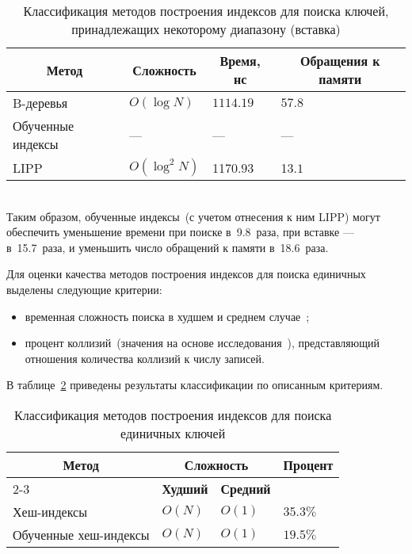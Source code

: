 {
\captionsetup{format=hang,justification=raggedleft,
              singlelinecheck=off,width=17cm}
\begin{longtable}[Hc]{|p{5cm}|p{2cm}|p{2cm}|p{2cm}|}
\caption{Классификация методов построения индексов для поиска ключей,
принадлежащих некоторому диапазону (вставка)\label{tab:02}}\\
    \hline
    \multicolumn{1}{|c|}{\textbf{Метод}} &
    \multicolumn{1}{c|}{\textbf{Сложность}} &
    \multicolumn{1}{c|}{\textbf{Время, нс}} &
    \multicolumn{1}{c|}{\parbox{3cm}{\vspace{2mm}\centering\textbf{Обращения к
    памяти}}}\\[2.5ex]
    \hline
    B-деревья
    & $O(\log N)$
    & $1114.19$
    & $57.8$\\
    \hline
    Обученные индексы
    & ---
    & ---
    & ---\\
    \hline
    LIPP 
    & $O(\log^2 N)$
    & \color{white}11\color{black}$70.93$
    & \color{white}1\color{black}$3.1$\\
    \hline
\end{longtable}
}
~\\

Таким образом, обученные индексы~(с учетом отнесения к ним LIPP) могут
обеспечить уменьшение времени при поиске в~9.8~раза, при вставке ---
в~15.7~раза, и уменьшить число обращений к памяти в~18.6~раза.

Для оценки качества методов построения индексов для поиска единичных выделены
следующие критерии:
\begin{itemize}
    \item временная сложность поиска в худшем и среднем случае~\cite{main,
        squares};
    \item процент коллизий~(значения на основе исследования~\cite{main}),
        представляющий отношения количества коллизий к числу записей.
        
\end{itemize}

В таблице~\ref{tab:03} приведены результаты классификации по описанным
критериям.

{
\captionsetup{format=hang,justification=raggedleft,
              singlelinecheck=off,width=17cm}
\begin{longtable}[Hc]{|p{5.3cm}|p{2cm}|p{2cm}|p{2cm}|}
\caption{Классификация методов построения индексов для поиска единичных
ключей\label{tab:03}}\\
    \hline
    \multicolumn{1}{|c|}{\multirow{2}{*}{\textbf{Метод}}} &
    \multicolumn{2}{c|}{\textbf{Сложность}} &
    \multicolumn{1}{c|}{\multirow{2}{*}{\parbox{2cm}{\textbf{Процент}}}}\\
    \cline{2-3}
    & \multicolumn{1}{c|}{\textbf{Худший}}
    & \multicolumn{1}{c|}{\textbf{Средний}}
    &\\
    \hline
    Хеш-индексы
    & $O(N)$
    & $O(1)$
    & $35.3\%$\\
    \hline
    Обученные хеш-индексы
    & $O(N)$
    & $O(1)$
    & $19.5\%$\\
    \hline
\end{longtable}
}

